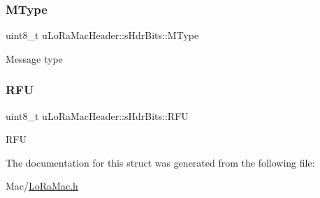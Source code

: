 \subsubsection{\texorpdfstring{M\+Type}{MType}}
{\footnotesize\ttfamily uint8\+\_\+t u\+Lo\+Ra\+Mac\+Header\+::s\+Hdr\+Bits\+::\+M\+Type}

Message type \mbox{\label{structuLoRaMacHeader_1_1sHdrBits_a74570244ef3b1052a532c1dfc2e83b7a}} 
\subsubsection{\texorpdfstring{R\+FU}{RFU}}
{\footnotesize\ttfamily uint8\+\_\+t u\+Lo\+Ra\+Mac\+Header\+::s\+Hdr\+Bits\+::\+R\+FU}

R\+FU 

The documentation for this struct was generated from the following file\+:\begin{DoxyCompactItemize}
\item 
Mac/\hyperlink{LoRaMac_8h}{Lo\+Ra\+Mac.\+h}\end{DoxyCompactItemize}
